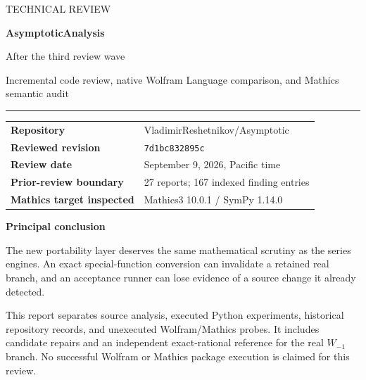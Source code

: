 \documentclass[11pt,a4paper]{article}
\begin{document}
\begin{titlepage}
\thispagestyle{empty}
{\sffamily\color{accent}\large TECHNICAL REVIEW\par}
\vspace{1.1cm}
{\sffamily\bfseries\color{ink}\Huge AsymptoticAnalysis\par}
\vspace{0.4cm}
{\sffamily\color{ink}\LARGE After the third review wave\par}
\vspace{0.7cm}
{\Large Incremental code review, native Wolfram Language comparison, and Mathics semantic audit\par}
\vspace{1.3cm}
\rule{\textwidth}{0.5pt}
\vspace{0.4cm}
\begin{tabular}{@{}ll@{}}
\textbf{Repository} & VladimirReshetnikov/Asymptotic\\[5pt]
\textbf{Reviewed revision} & \texttt{7d1bc832895c}\\[5pt]
\textbf{Review date} & September 9, 2026, Pacific time\\[5pt]
\textbf{Prior-review boundary} & 27 reports; 167 indexed finding entries\\[5pt]
\textbf{Mathics target inspected} & Mathics3 10.0.1 / SymPy 1.14.0
\end{tabular}
\vfill
{\large\bfseries Principal conclusion\par}
The new portability layer deserves the same mathematical scrutiny as the series engines. An exact special-function conversion can invalidate a retained real branch, and an acceptance runner can lose evidence of a source change it already detected.\par
\vspace{0.6cm}
{\small\color{muted}This report separates source analysis, executed Python experiments, historical repository records, and unexecuted Wolfram/Mathics probes. It includes candidate repairs and an independent exact-rational reference for the real $W_{-1}$ branch. No successful Wolfram or Mathics package execution is claimed for this review.}
\end{titlepage}
\end{document}
